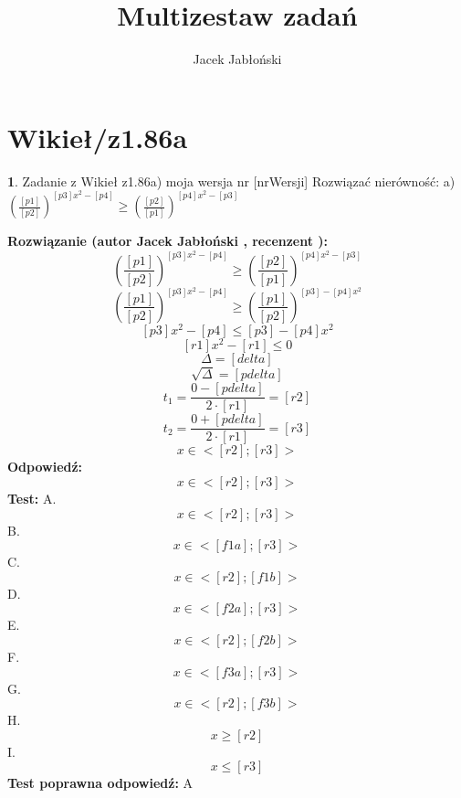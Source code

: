 \documentclass[12pt, a4paper]{article}
\title{Multizestaw zadań}
\author{Jacek Jabłoński}
\date{}
\theoremstyle{definition} %
\newtheorem{zad}{}
\newcommand{\kategoria}[1]{\section{#1}} %
\newcommand{\zadStart}[1]{\begin{zad}#1\newline} %
\newcommand{\zadStop}{\end{zad}}   %
\newcommand{\rozwStart}[2]{\noindent \textbf{Rozwiązanie (autor #1 , recenzent #2): }\newline} %
\newcommand{\rozwStop}{\newline}                                            %
\newcommand{\odpStart}{\noindent \textbf{Odpowiedź:}\newline}    %
\newcommand{\odpStop}{\newline}                                             %
\newcommand{\testStart}{\noindent \textbf{Test:}\newline} %
\newcommand{\testStop}{\newline} %
\newcommand{\kluczStart}{\noindent \textbf{Test poprawna odpowiedź:}\newline} %
\newcommand{\kluczStop}{\newline} %
\begin{document}
\maketitle


\kategoria{Wikieł/z1.86a}
\zadStart{Zadanie z Wikieł z1.86a) moja wersja nr [nrWersji]}
Rozwiązać nierówność:
a) $(\frac{[p1]}{[p2]})^{[p3]x^2-[p4]} \geq (\frac{[p2]}{[p1]})^{[p4]x^2-[p3]} $
\zadStop
\rozwStart{Jacek Jabłoński}{}
$$(\frac{[p1]}{[p2]})^{[p3]x^2-[p4]} \geq (\frac{[p2]}{[p1]})^{[p4]x^2-[p3]}$$
$$(\frac{[p1]}{[p2]})^{[p3]x^2-[p4]} \geq (\frac{[p1]}{[p2]})^{[p3]-[p4]x^2}$$
$$[p3]x^2-[p4] \leq [p3]-[p4]x^2 $$
$$[r1]x^2 - [r1] \leq 0 $$
$$\Delta=[delta]$$
$$\sqrt{\Delta} = [pdelta]$$
$$t_1=\frac{0-[pdelta]}{2 \cdot [r1]} = [r2]$$
$$t_2=\frac{0+[pdelta]}{2 \cdot [r1]} = [r3]$$ 
$$x \in <[r2] ; [r3]>$$
\rozwStop
\odpStart
$$x \in <[r2] ; [r3]>$$
\odpStop
\testStart
A. $$x \in <[r2] ; [r3]>$$
B. $$x \in <[f1a] ; [r3]>$$
C. $$x \in <[r2] ; [f1b]>$$
D. $$x \in <[f2a] ; [r3]>$$
E. $$x \in <[r2] ; [f2b]>$$
F. $$x \in <[f3a] ; [r3]>$$
G. $$x \in <[r2] ; [f3b]>$$
H. $$x \geq [r2]$$
I.$$x \leq [r3]$$
\testStop
\kluczStart
A
\kluczStop
\end{document}
